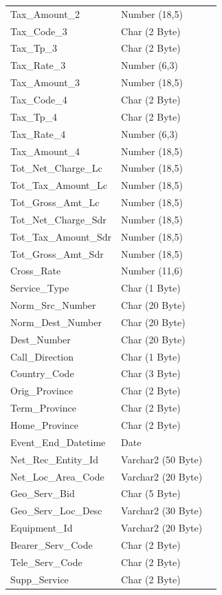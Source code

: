 \documentclass[12pt,twoside]{article}
\begin{document}
\begin{longtable}{l|l|l}
Tax\_Amount\_2 & Number (18,5) & \\
Tax\_Code\_3 & Char (2 Byte) & \\
Tax\_Tp\_3 & Char (2 Byte) & \\
Tax\_Rate\_3 & Number (6,3) & \\
Tax\_Amount\_3 & Number (18,5) & \\
Tax\_Code\_4 & Char (2 Byte) & \\
Tax\_Tp\_4 & Char (2 Byte) & \\
Tax\_Rate\_4 & Number (6,3) & \\
Tax\_Amount\_4 & Number (18,5) & \\
Tot\_Net\_Charge\_Lc & Number (18,5) & \\
Tot\_Tax\_Amount\_Lc & Number (18,5) & \\
Tot\_Gross\_Amt\_Lc & Number (18,5) & \\
Tot\_Net\_Charge\_Sdr & Number (18,5) & \\
Tot\_Tax\_Amount\_Sdr & Number (18,5) & \\
Tot\_Gross\_Amt\_Sdr & Number (18,5) & \\
Cross\_Rate & Number (11,6) & \\
Service\_Type & Char (1 Byte) & \\
Norm\_Src\_Number & Char (20 Byte) & \\
Norm\_Dest\_Number & Char (20 Byte) & \\
Dest\_Number & Char (20 Byte) & \\
Call\_Direction & Char (1 Byte) & \\
Country\_Code & Char (3 Byte) & \\
Orig\_Province & Char (2 Byte) & \\
Term\_Province & Char (2 Byte) & \\
Home\_Province & Char (2 Byte) & \\
Event\_End\_Datetime & Date & \\
Net\_Rec\_Entity\_Id & Varchar2 (50 Byte) & \\
Net\_Loc\_Area\_Code & Varchar2 (20 Byte) & \\
Geo\_Serv\_Bid & Char (5 Byte) & \\
Geo\_Serv\_Loc\_Desc & Varchar2 (30 Byte) & \\
Equipment\_Id & Varchar2 (20 Byte) & \\
Bearer\_Serv\_Code & Char (2 Byte) & \\
Tele\_Serv\_Code & Char (2 Byte) & \\
Supp\_Service & Char (2 Byte) & \\

\end{longtable}
\end{document}
